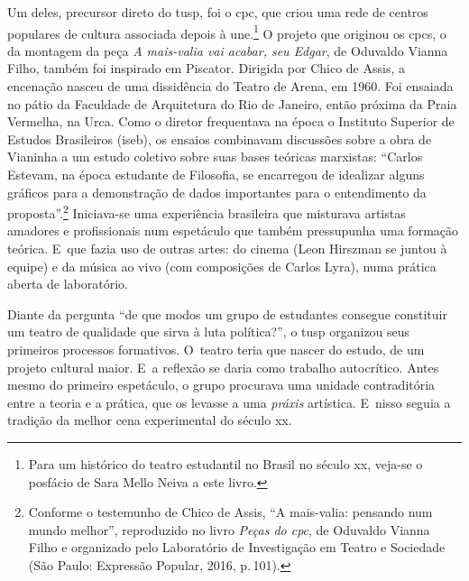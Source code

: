 Um deles, precursor direto do {\sc tusp}, foi o {\sc cpc}, que criou uma rede de
centros populares de cultura associada depois à {\sc une}.\footnote{Para um
  histórico do teatro estudantil no Brasil no século {\sc xx}, veja-se o
  posfácio de Sara Mello Neiva a este livro.} O projeto que originou os
{\sc cpc}s, o da montagem da peça {\it A mais-valia vai acabar, seu Edgar}, de
Oduvaldo Vianna Filho, também foi inspirado em Piscator. Dirigida por
Chico de Assis, a encenação nasceu de uma dissidência do Teatro de Arena,
em 1960. Foi ensaiada no pátio da Faculdade de Arquitetura do Rio de
Janeiro, então próxima da Praia Vermelha, na Urca. Como o diretor
frequentava na época o Instituto Superior de Estudos Brasileiros ({\sc iseb}),
os ensaios combinavam discussões sobre a obra de Vianinha a um estudo
coletivo sobre suas bases teóricas marxistas: “Carlos Estevam, na época
estudante de Filosofia, se encarregou de idealizar alguns gráficos para
a demonstração de dados importantes para o entendimento da
proposta”.\footnote{Conforme o testemunho de Chico de Assis, “A
  mais-valia: pensando num mundo melhor”, reproduzido no livro
  {\it Peças do {\sc cpc}}, de Oduvaldo Vianna Filho e organizado pelo Laboratório de Investigação em Teatro e Sociedade (São Paulo:
  Expressão Popular, 2016, p.\,101).} Iniciava-se uma experiência
brasileira que misturava artistas amadores e profissionais num
espetáculo que também pressupunha uma formação teórica. E~que
fazia uso de outras artes: do cinema (Leon Hirszman se juntou à equipe)
e da música ao vivo (com composições de Carlos Lyra), numa prática
aberta de laboratório.


Diante da pergunta “de que modos um grupo de estudantes consegue
constituir um teatro de qualidade que sirva à luta política?”, o {\sc tusp}
organizou seus primeiros processos formativos. O~teatro teria que nascer
do estudo, de um projeto cultural maior. E~a reflexão se daria como
trabalho autocrítico. Antes mesmo do primeiro espetáculo, o grupo
procurava uma unidade contraditória entre a teoria e a prática, que os
levasse a uma {\it práxis} artística. E~nisso seguia a tradição da
melhor cena experimental do século {\sc xx}.


